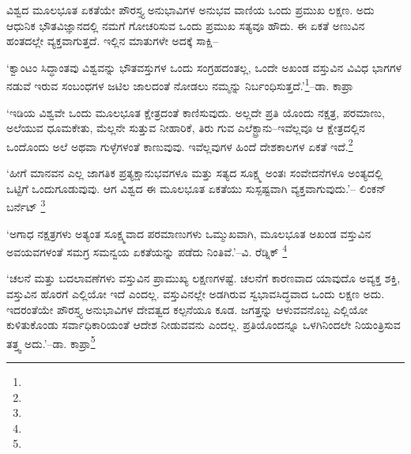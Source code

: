ವಿಶ್ವದ ಮೂಲಭೂತ ಏಕತೆಯೇ ಪೌರಸ್ತ್ಯ ಅನುಭಾವಿಗಳ ಅನುಭವ ವಾಣಿಯ ಒಂದು ಪ್ರಮುಖ ಲಕ್ಷಣ. ಅದು ಆಧುನಿಕ ಭೌತವಿಜ್ಞಾನದಲ್ಲಿ ನಮಗೆ ಗೋಚರಿಸುವ ಒಂದು ಪ್ರಮುಖ ಸತ್ಯವೂ ಹೌದು. ಈ ಏಕತೆ ಅಣುವಿನ ಹಂತದಲ್ಲೇ ವ್ಯಕ್ತವಾಗುತ್ತದೆ. ಇಲ್ಲಿನ ಮಾತುಗಳೇ ಅದಕ್ಕೆ ಸಾಕ್ಷಿ–

‘ಕ್ವಾಂಟಂ ಸಿದ್ಧಾಂತವು ವಿಶ್ವವನ್ನು ಭೌತವಸ್ತುಗಳ ಒಂದು ಸಂಗ್ರಹದಂತಲ್ಲ, ಒಂದೇ ಅಖಂಡ ವಸ್ತುವಿನ ವಿವಿಧ ಭಾಗಗಳ ನಡುವೆ ಇರುವ ಸಂಬಂಧಗಳ ಜಟಿಲ ಜಾಲದಂತೆ ನೋಡಲು ನಮ್ಮನ್ನು ನಿರ್ಬಂಧಿಸುತ್ತದೆ.’\footnote{\hfill{}}–ಡಾ. ಕಾಪ್ರಾ

‘ಇಡಿಯ ವಿಶ್ವವೇ ಒಂದು ಮೂಲಭೂತ ಕ್ಷೇತ್ರದಂತೆ ಕಾಣಿಸುವುದು. ಅಲ್ಲದೇ ಪ್ರತಿ ಯೊಂದು ನಕ್ಷತ್ರ, ಪರಮಾಣು, ಅಲೆಯುವ ಧೂಮಕೇತು, ಮೆಲ್ಲನೇ ಸುತ್ತುವ ನೀಹಾರಿಕೆ, ತಿರು ಗುವ ಎಲೆಕ್ಟ್ರಾನು–ಇವೆಲ್ಲವೂ ಆ ಕ್ಷೇತ್ರದಲ್ಲಿನ ಒಂದೊಂದು ಅಲೆ ಅಥವಾ ಗುಳ್ಳೆಗಳಂತೆ ಕಾಣುವುವು. ಇವೆಲ್ಲವುಗಳ ಹಿಂದೆ ದೇಶಕಾಲಗಳ ಏಕತೆ ಇದೆ.\footnote{}

‘ಹೀಗೆ ಮಾನವನ ಎಲ್ಲ ಜಾಗತಿಕ ಪ್ರತ್ಯಕ್ಷಾನುಭವಗಳೂ ಮತ್ತು ಸತ್ಯದ ಸೂಕ್ಷ್ಮ ಅಂತಃ ಸಂವೇದನೆಗಳೂ ಅಂತ್ಯದಲ್ಲಿ ಒಟ್ಟಿಗೆ ಒಂದುಗೂಡುವುವು. ಆಗ ವಿಶ್ವದ ಈ ಮೂಲಭೂತ ಏಕತೆಯು ಸುಸ್ಪಷ್ಟವಾಗಿ ವ್ಯಕ್ತವಾಗುವುದು.’– ಲಿಂಕನ್ ಬರ್ನೆಟ್ \footnote{\hfill{}}

‘ಅಗಾಧ ನಕ್ಷತ್ರಗಳು ಅತ್ಯಂತ ಸೂಕ್ಷ್ಮವಾದ ಪರಮಾಣುಗಳು ಒಮ್ಮುಖವಾಗಿ, ಮೂಲಭೂತ ಅಖಂಡ ವಸ್ತುವಿನ ಅವಯವಗಳಂತೆ ಸಮಗ್ರ ಸಮನ್ವಯ ಏಕತೆಯನ್ನು ಪಡೆದು ನಿಂತಿವೆ.’\break–ವಿ. ರೆಡ್ನಿಕ್ \footnote{\hfill\hbox{}}

‘ಚಲನೆ ಮತ್ತು ಬದಲಾವಣೆಗಳು ವಸ್ತುವಿನ ಪ್ರಾಮುಖ್ಯ ಲಕ್ಷಣಗಳಷ್ಟೆ. ಚಲನೆಗೆ ಕಾರಣವಾದ ಯಾವುದೊ ಅವ್ಯಕ್ತ ಶಕ್ತಿ, ವಸ್ತುವಿನ ಹೊರಗೆ ಎಲ್ಲಿಯೋ ಇದೆ ಎಂದಲ್ಲ. ವಸ್ತುವಿನಲ್ಲೇ ಅಡಗಿರುವ ಸ್ವಭಾವಸಿದ್ಧವಾದ ಒಂದು ಲಕ್ಷಣ ಅದು. ಇದರಂತೆಯೇ ಪೌರಸ್ತ್ಯ \hbox{ಅನುಭಾವಿಗಳ} ದೇವತ್ವದ ಕಲ್ಪನೆಯೂ ಕೂಡ. ಜಗತ್ತನ್ನು ಆಳುವವನೊಬ್ಬ ಎಲ್ಲಿಯೋ ಕುಳಿತುಕೊಂಡು ಸರ್ವಾಧಿ\-ಕಾರಿಯಂತೆ ಆದೇಶ ನೀಡುವವನು ಎಂದಲ್ಲ. ಪ್ರತಿಯೊಂದನ್ನೂ ಒಳಗಿನಿಂದಲೇ ನಿಯಂತ್ರಿಸುವ ತತ್ತ್ವ ಅದು.’–ಡಾ. ಕಾಪ್ರಾ\footnote{\hfill{}}

